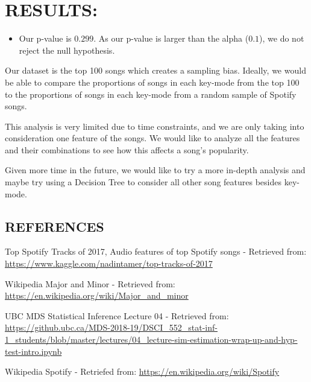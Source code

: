 \documentclass[]{article}
\providecommand{\tightlist}{%
  \setlength{\itemsep}{0pt}\setlength{\parskip}{0pt}}
\begin{document}
\section{RESULTS:}\label{results}

\begin{itemize}
\tightlist
\item
  Our p-value is \textbf{$0.299$}. As our p-value is larger than the
  alpha (\textbf{$0.1$}), we do not reject the null hypothesis.
\end{itemize}

Our dataset is the top 100 songs which creates a sampling bias. Ideally,
we would be able to compare the proportions of songs in each key-mode
from the top 100 to the proportions of songs in each key-mode from a
random sample of Spotify songs.

This analysis is very limited due to time constraints, and we are only
taking into consideration one feature of the songs. We would like to
analyze all the features and their combinations to see how this affects
a song's popularity.

Given more time in the future, we would like to try a more in-depth
analysis and maybe try using a Decision Tree to consider all other song
features besides key-mode.

\subsection{REFERENCES}\label{references}

Top Spotify Tracks of 2017, Audio features of top Spotify songs -
Retrieved from:
\url{https://www.kaggle.com/nadintamer/top-tracks-of-2017}

Wikipedia Major and Minor - Retrieved from:
\url{https://en.wikipedia.org/wiki/Major_and_minor}

UBC MDS Statistical Inference Lecture 04 - Retrieved from:
\url{https://github.ubc.ca/MDS-2018-19/DSCI_552_stat-inf-1_students/blob/master/lectures/04_lecture-sim-estimation-wrap-up-and-hyp-test-intro.ipynb}

Wikipedia Spotify - Retriefed from:
\url{https://en.wikipedia.org/wiki/Spotify}
\end{document}
